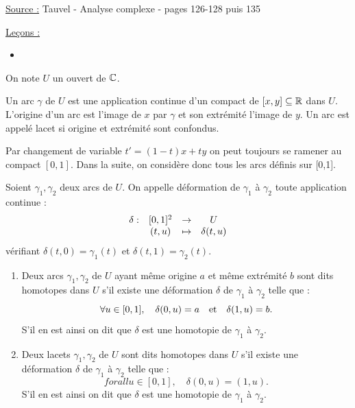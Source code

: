 

\pagestyle{fancy}

\fancyhead[C]{}
\fancyhead[R]{}



\underline{Source :} Tauvel - Analyse complexe - pages 126-128 puis 135

\underline{Leçons :}
\begin{itemize}
\item 
\end{itemize}

\begin{nota}
On note $U$ un ouvert de $\mathbb{C}$.
\end{nota}

\begin{defn}
Un arc $\gamma$ de $U$ est une application continue d'un compact de $[x,y] \subseteq \mathbb{R}$ dans $U$.
L'origine d'un arc est l'image de $x$ par $\gamma$ et son extrémité l'image de $y$.
Un arc est appelé lacet si origine et extrémité sont confondus.
\end{defn}

\begin{rmq}
Par changement de variable $t' = (1-t)x + ty$ on peut toujours se ramener au compact $[0,1]$. 
Dans la suite, on considère donc tous les arcs définis sur [0,1].
\end{rmq}

\begin{defn}[déformation]
Soient $\gamma_1, \gamma_2$ deux arcs de $U$. On appelle déformation de $\gamma_1$ à $\gamma_2$ toute application continue :
\[ \begin{array}{c c c c}
\delta : & [0,1]^2 & \to & U \\
& (t,u) & \mapsto & \delta(t,u) 
\end{array} \]
vérifiant $\delta(t,0) = \gamma_1(t)$ et $\delta(t,1) = \gamma_2(t)$.
\end{defn}

\begin{defn}[homotopie]
\begin{enumerate}[label=(\roman*)]
\item Deux arcs $\gamma_1, \gamma_2$ de $U$ ayant même origine $a$ et même extrémité $b$ sont dits homotopes dans $U$
s'il existe une déformation $\delta$ de $\gamma_1$ à $\gamma_2$ telle que :
\[ \forall u \in [0,1], \quad \delta(0,u)=a \quad \text{et} \quad \delta(1,u)=b . \]
S'il en est ainsi on dit que $\delta$ est une homotopie de $\gamma_1$ à $\gamma_2$.
\item Deux lacets $\gamma_1, \gamma_2$ de $U$ sont dits homotopes dans $U$ s'il existe une déformation $\delta$ 
de $\gamma_1$ à $\gamma_2$ telle que :
\[ forall u \in [0,1], \quad \delta(0,u) = (1,u) . \]
S'il en est ainsi on dit que $\delta$ est une homotopie de $\gamma_1$ à $\gamma_2$.
\end{enumerate}
\end{defn}

